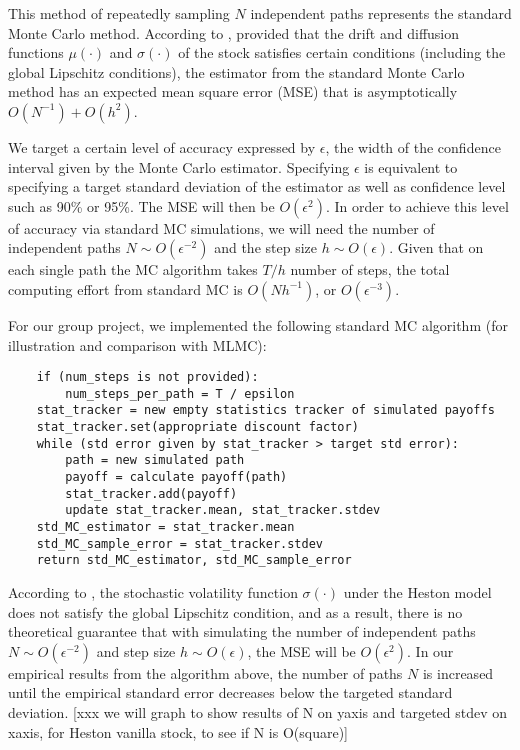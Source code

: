 \documentclass{article}
\begin{document}
    This method of repeatedly sampling $N$ independent paths represents the standard Monte Carlo method. According to \cite{giles08}, provided that the drift and diffusion functions $\mu(\cdot)$ and $\sigma(\cdot)$ of the stock satisfies certain conditions (including the global Lipschitz conditions), the estimator from the standard Monte Carlo method has an expected mean square error (MSE) that is asymptotically $O(N^{-1}) + O(h^2)$. 
    
    We target a certain level of accuracy expressed by $\epsilon$, the width of the confidence interval given by the Monte Carlo estimator. Specifying $\epsilon$ is equivalent to specifying a target standard deviation of the estimator as well as confidence level such as 90\% or 95\%. The MSE will then be $O(\epsilon^2)$. In order to achieve this level of accuracy via standard MC simulations, we will need the number of independent paths $N \sim O(\epsilon^{-2})$ and the step size $h \sim O(\epsilon)$. Given that on each single path the MC algorithm takes $T/h$ number of steps, the total computing effort from standard MC is $O(Nh^{-1})$, or $O(\epsilon^{-3})$. 
    
    For our group project, we implemented the following standard MC algorithm (for illustration and comparison with MLMC):
    \begin{lstlisting}
    if (num_steps is not provided):
        num_steps_per_path = T / epsilon
    stat_tracker = new empty statistics tracker of simulated payoffs
    stat_tracker.set(appropriate discount factor)
    while (std error given by stat_tracker > target std error):
        path = new simulated path
        payoff = calculate payoff(path)
        stat_tracker.add(payoff)
        update stat_tracker.mean, stat_tracker.stdev
    std_MC_estimator = stat_tracker.mean
    std_MC_sample_error = stat_tracker.stdev
    return std_MC_estimator, std_MC_sample_error
    \end{lstlisting}
    
    According to \cite{giles08}, the stochastic volatility function $\sigma(\cdot)$ under the Heston model does not satisfy the global Lipschitz condition, and as a result, there is no theoretical guarantee that with simulating the number of independent paths $N \sim O(\epsilon^{-2})$ and step size $h \sim O(\epsilon)$, the MSE will be $O(\epsilon^2)$. In our empirical results from the algorithm above, the number of paths $N$ is increased until the empirical standard error decreases below the targeted standard deviation. [xxx we will graph to show results of N on yaxis and targeted stdev on xaxis, for Heston vanilla stock, to see if N is O(square)]	
\end{document}
